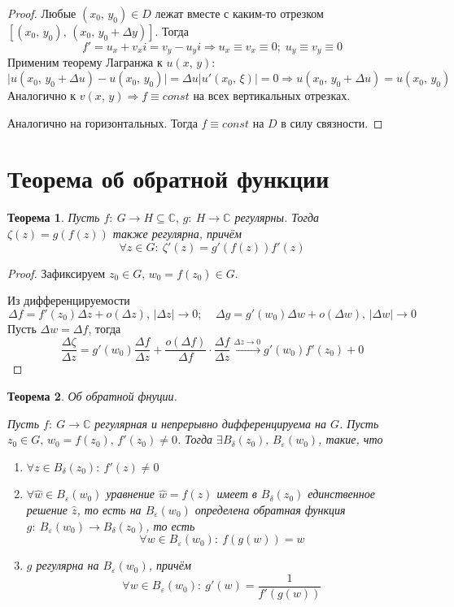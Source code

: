\documentclass[a4paper,12pt]{article}
\theoremstyle{plain}
\newtheorem{theorem}{Теорема}[section]
\theoremstyle{definition}
\theoremstyle{remark}
\begin{document}
\begin{proof}
	Любые $(x_0,\, y_0) \in D$ лежат вместе с каким-то отрезком $[(x_0,\, y_0),\, (x_0,\, y_0 + \Delta y)]$. Тогда
	\[
		f' = u_x + v_xi = v_y - u_yi \Rightarrow u_x \equiv v_x \equiv 0;\; u_y \equiv v_y \equiv 0
	\]
	Применим теорему Лагранжа к $u(x,\,y)$:
	\[
		\vert u(x_0,\, y_0 + \Delta u) - u(x_0,\, y_0)\vert = \Delta u\vert u'(x_0,\, \xi)\vert = 0 \Rightarrow u(x_0,\, y_0 + \Delta u) = u(x_0,\, y_0)
	\]
	Аналогично к $v(x,\,y) \Rightarrow f \equiv const$ на всех вертикальных отрезках.

	Аналогично на горизонтальных. Тогда $f \equiv const$ на $D$ в силу связности.
\end{proof}

\section{Теорема об обратной функции}
\begin{theorem}
	Пусть $f :\: G \to H \subseteq \mathbb{C},\, g :\: H \to \mathbb{C}$ регулярны. Тогда $\zeta(z) = g(f(z))$ также регулярна, причём
	\[
		\forall z \in G :\: \zeta'(z) = g'(f(z))f'(z)
	\]
\end{theorem}

\begin{proof}
	Зафиксируем $z_0 \in G,\, w_0 = f(z_0) \in G$.

	Из дифференцируемости
	\[
		\Delta f = f'(z_0)\Delta z + o(\Delta z),\, \vert\Delta z\vert \to 0;\;\;\;\; \Delta g = g'(w_0)\Delta w + o(\Delta w),\, \vert\Delta w\vert \to 0
	\]
	Пусть $\Delta w = \Delta f$, тогда
	\[
		\frac{\Delta\zeta}{\Delta z} = g'(w_0)\frac{\Delta f}{\Delta z} + \frac{o(\Delta f)}{\Delta f}\cdot\frac{\Delta f}{\Delta z} \overset{\Delta z \to 0}{\to} g'(w_0)f'(z_0) + 0
	\]
\end{proof}

\begin{theorem}
	Об обратной фнуции.

	Пусть $f :\: G \to \mathbb{C}$ регулярная и непрерывно дифференцируема на $G$. Пусть $z_0 \in G,\, w_0 = f(z_0),\, f'(z_0) \neq 0$. Тогда $\exists B_\delta(z_0),\, B_\varepsilon(w_0)$, такие, что
	\begin{enumerate}
		\item $\forall z \in B_\delta(z_0) :\: f'(z) \neq 0$
		\item $\forall \hat{w} \in B_\varepsilon(w_0)$ уравнение $\hat{w} = f(z)$ имеет в $B_\delta(z_0)$ единственное решение $\hat{z}$, то есть на $B_\varepsilon(w_0)$ определена обратная функция $g :\: B_\varepsilon(w_0) \to B_\delta(z_0)$, то есть
		      \[
			      \forall w \in B_\varepsilon(w_0) :\: f(g(w)) = w
		      \]
		\item $g$ регулярна на $B_\varepsilon(w_0)$, причём
		      \[
			      \forall w \in B_\varepsilon(w_0) :\: g'(w) = \frac{1}{f'(g(w))}
		      \]
	\end{enumerate}
\end{theorem}
\end{document}
